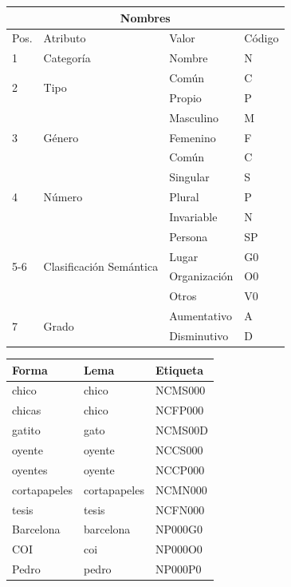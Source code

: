 \begin{center}
\begin{tabular}{| l | l | l | l |}
 \hline
 \multicolumn{4}{|c|}{Nombres} \\ \hline
Pos. & Atributo & Valor & Código \\ \hline
1 & Categoría &  Nombre & N \\ \hline
\multirow{2}{*}{2} & \multirow{2}{*}{Tipo} & Común  & C \\ \cline{3-4}
  & &      Propio & P \\ \hline
\multirow{3}{*}{3} & \multirow{3}{*}{Género} & Masculino & M \\ \cline{3-4}
 & & Femenino &  F \\ \cline{3-4}
 & & Común    & C  \\ \hline
\multirow{3}{*}{4} & \multirow{3}{*}{Número} & Singular & S \\ \cline{3-4}
 & & Plural &  P \\ \cline{3-4}
 & & Invariable & N  \\ \hline
 \multirow{4}{*}{5-6} & \multirow{4}{*}{Clasificación Semántica} & Persona & SP \\ \cline{3-4}
 & & Lugar &  G0 \\ \cline{3-4}
 & & Organización &  O0 \\ \cline{3-4}
 & & Otros & V0  \\ \hline
\multirow{2}{*}{7} & \multirow{2}{*}{Grado} & Aumentativo  & A \\ \cline{3-4}
  & & Disminutivo & D \\ \hline
\end{tabular}
\end{center}


\begin{center}
\begin{tabular}{| l | l | l |}
 \hline
Forma & Lema & Etiqueta \\ \hline 
chico & chico & NCMS000 \\ \hline
chicas & chico & NCFP000 \\ \hline
gatito & gato & NCMS00D \\ \hline
oyente & oyente & NCCS000 \\ \hline
oyentes & oyente & NCCP000 \\ \hline
cortapapeles & cortapapeles &NCMN000 \\ \hline
tesis & tesis & NCFN000 \\ \hline
Barcelona & barcelona & NP000G0 \\ \hline
COI & coi & NP000O0 \\ \hline
Pedro & pedro & NP000P0 \\ \hline
\end{tabular}
\end{center}


